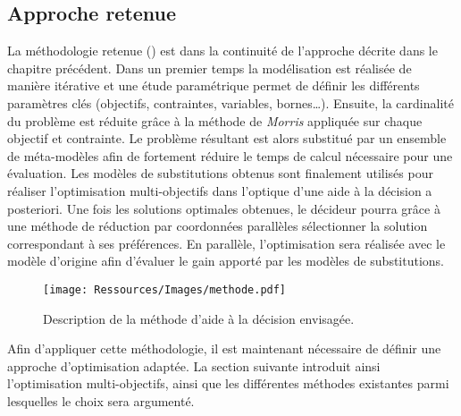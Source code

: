 \subsection{Approche retenue} %
\label{sub:approche_retenue_reduction}
La méthodologie retenue () est dans la continuité de
l’approche décrite dans le chapitre précédent.
Dans un premier temps la modélisation est réalisée de manière itérative et une étude
paramétrique permet de définir les différents paramètres clés (objectifs, contraintes,
variables, bornes\dots). Ensuite, la cardinalité du problème est réduite grâce à la
méthode de \textit{Morris} appliquée sur chaque objectif et contrainte. Le problème
résultant est alors substitué par un ensemble de méta-modèles afin de fortement réduire le
temps de calcul nécessaire pour une évaluation. Les modèles de substitutions obtenus
sont finalement utilisés pour réaliser l’optimisation multi-objectifs dans l’optique
d’une aide à la décision a posteriori. Une fois les solutions optimales obtenues, le
décideur pourra grâce à une méthode de réduction par coordonnées parallèles sélectionner
la solution correspondant à ses préférences. En parallèle, l’optimisation sera réalisée
avec le modèle d’origine afin d’évaluer le gain apporté par les modèles de substitutions.

\begin{figure}
    \centering
    \texttt{[image: Ressources/Images/methode.pdf]}
    \caption[Description de la méthode d’aide à la décision envisagée]
            {Description de la méthode d’aide à la décision envisagée.}
    \label{fig:methode_aide_decision}
\end{figure}

Afin d’appliquer cette méthodologie, il est maintenant nécessaire de définir une approche
d’optimisation adaptée. La section suivante introduit ainsi l’optimisation multi-objectifs,
ainsi que les différentes méthodes existantes parmi lesquelles le choix sera argumenté.





